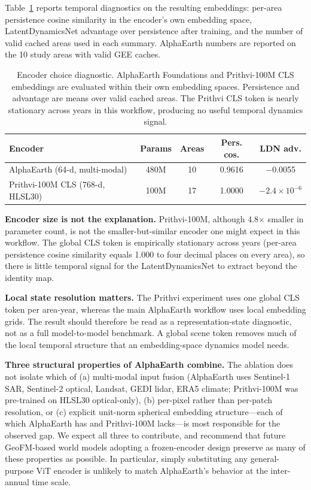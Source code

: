 \documentclass{article}
\begin{document}
Table~\ref{tab:encoder_ablation} reports temporal diagnostics on the resulting embeddings: per-area persistence cosine similarity in the encoder's own embedding space, LatentDynamicsNet advantage over persistence after training, and the number of valid cached areas used in each summary. AlphaEarth numbers are reported on the 10 study areas with valid GEE caches.

\begin{table}[htbp]
\centering
\caption{Encoder choice diagnostic. AlphaEarth Foundations and Prithvi-100M CLS embeddings are evaluated within their own embedding spaces. Persistence and advantage are means over valid cached areas. The Prithvi CLS token is nearly stationary across years in this workflow, producing no useful temporal dynamics signal.}
\label{tab:encoder_ablation}
\small
\begin{tabular*}{\textwidth}{@{\extracolsep{\fill}}lcccc@{}}
\toprule
Encoder & Params & Areas & Pers. cos. & LDN adv. \\
\midrule
AlphaEarth (64-d, multi-modal) & 480M & 10 & 0.9616 & $-$0.0055 \\
Prithvi-100M CLS (768-d, HLSL30) & 100M & 17 & 1.0000 & $-2.4 \times 10^{-6}$ \\
\bottomrule
\end{tabular*}
\end{table}

\textbf{Encoder size is not the explanation.} Prithvi-100M, although 4.8$\times$ smaller in parameter count, is not the smaller-but-similar encoder one might expect in this workflow. The global CLS token is empirically stationary across years (per-area persistence cosine similarity equals 1.000 to four decimal places on every area), so there is little temporal signal for the LatentDynamicsNet to extract beyond the identity map.

\textbf{Local state resolution matters.} The Prithvi experiment uses one global CLS token per area-year, whereas the main AlphaEarth workflow uses local embedding grids. The result should therefore be read as a representation-state diagnostic, not as a full model-to-model benchmark. A global scene token removes much of the local temporal structure that an embedding-space dynamics model needs.

\textbf{Three structural properties of AlphaEarth combine.} The ablation does not isolate which of (a) multi-modal input fusion (AlphaEarth uses Sentinel-1 SAR, Sentinel-2 optical, Landsat, GEDI lidar, ERA5 climate; Prithvi-100M was pre-trained on HLSL30 optical-only), (b) per-pixel rather than per-patch resolution, or (c) explicit unit-norm spherical embedding structure---each of which AlphaEarth has and Prithvi-100M lacks---is most responsible for the observed gap. We expect all three to contribute, and recommend that future GeoFM-based world models adopting a frozen-encoder design preserve as many of these properties as possible. In particular, simply substituting any general-purpose ViT encoder is unlikely to match AlphaEarth's behavior at the inter-annual time scale.
\end{document}
